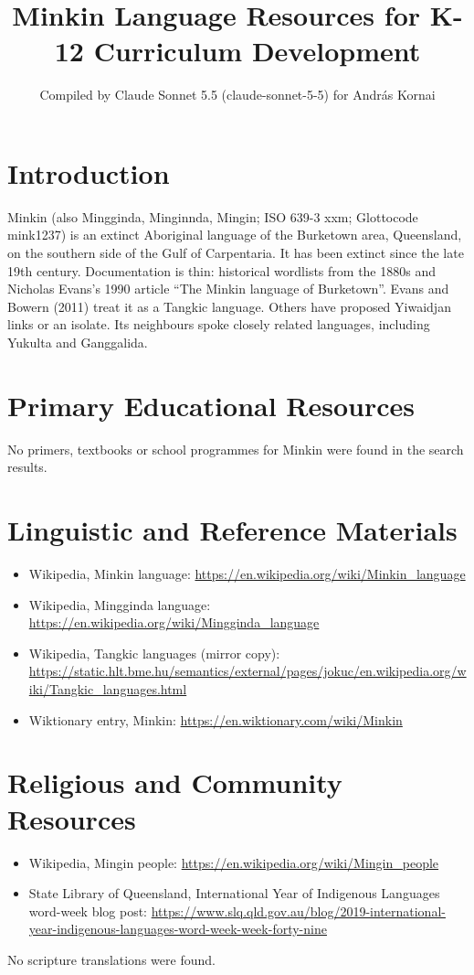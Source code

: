 \documentclass[12pt]{article}
\title{Minkin Language Resources for K-12 Curriculum Development}
\author{Compiled by Claude Sonnet 5.5 (claude-sonnet-5-5) for Andr\'as Kornai}
\date{}
\begin{document}
\maketitle

\section{Introduction}
Minkin (also Mingginda, Minginnda, Mingin; ISO 639-3 xxm; Glottocode mink1237) is an extinct Aboriginal language of the Burketown area, Queensland, on the southern side of the Gulf of Carpentaria. It has been extinct since the late 19th century. Documentation is thin: historical wordlists from the 1880s and Nicholas Evans's 1990 article ``The Minkin language of Burketown''. Evans and Bowern (2011) treat it as a Tangkic language. Others have proposed Yiwaidjan links or an isolate. Its neighbours spoke closely related languages, including Yukulta and Ganggalida.

\section{Primary Educational Resources}
No primers, textbooks or school programmes for Minkin were found in the search results.

\section{Linguistic and Reference Materials}
\begin{itemize}
\item Wikipedia, Minkin language: \url{https://en.wikipedia.org/wiki/Minkin_language}
\item Wikipedia, Mingginda language: \url{https://en.wikipedia.org/wiki/Mingginda_language}
\item Wikipedia, Tangkic languages (mirror copy): \url{https://static.hlt.bme.hu/semantics/external/pages/jokuc/en.wikipedia.org/wiki/Tangkic_languages.html}
\item Wiktionary entry, Minkin: \url{https://en.wiktionary.com/wiki/Minkin}
\end{itemize}

\section{Religious and Community Resources}
\begin{itemize}
\item Wikipedia, Mingin people: \url{https://en.wikipedia.org/wiki/Mingin_people}
\item State Library of Queensland, International Year of Indigenous Languages word-week blog post: \url{https://www.slq.qld.gov.au/blog/2019-international-year-indigenous-languages-word-week-week-forty-nine}
\end{itemize}
No scripture translations were found.
\end{document}
